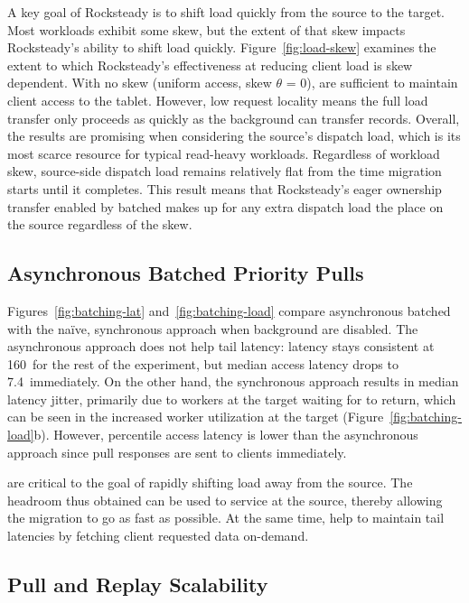 A key goal of Rocksteady is to shift load quickly from the source to the
target. Most workloads exhibit some skew, but the extent of that skew impacts
Rocksteady's ability to shift load quickly. Figure~\ref{fig:load-skew}
examines the extent to which Rocksteady's effectiveness at reducing client load
is skew dependent. With no skew (uniform access, skew $\theta$ = 0), \priopulls are
sufficient to maintain client access to the tablet. However, low request locality
means the full load transfer only proceeds as quickly as the background
\pulls
can transfer records.  Overall, the results are promising when considering the
source's dispatch load, which is its most scarce resource for typical
read-heavy workloads. Regardless of workload skew, source-side dispatch load
remains relatively flat from the time migration starts until it completes.
This result means that Rocksteady's eager ownership transfer enabled by
batched \priopulls makes up for any extra dispatch load the \pulls place
on the source regardless of the skew.


\subsection{Asynchronous Batched Priority Pulls}
\label{sec:eval-priopulls}

Figures~\ref{fig:batching-lat} and~\ref{fig:batching-load} compare
asynchronous batched \priopulls with the na\"{i}ve, synchronous approach
when background \pulls are disabled. The asynchronous
approach does not help tail latency:
\nnnth latency stays consistent at 160~\us for the rest of the
experiment, but median access latency drops to 7.4~\us immediately.
On the other hand, the synchronous approach results in
median latency jitter,
primarily due to workers at the target waiting for \priopulls to return, which
can be seen in the increased worker utilization at the target
(Figure~\ref{fig:batching-load}b).  However, \nnnth percentile access latency
is lower than the asynchronous approach since pull responses are sent to
clients immediately.

\priopulls are critical to the goal of
rapidly shifting load away from the source. The headroom thus
obtained can be used to service \pulls at the source, thereby allowing
the migration to go as fast as possible. At the same time, \priopulls
help to maintain tail latencies by fetching client requested data
on-demand.

\subsection{Pull and Replay Scalability}
\label{sec:eval-replay}


